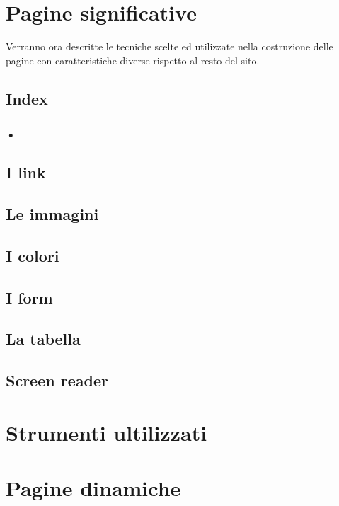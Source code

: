 \documentclass[10pt,a4paper,onecolumn]{article}
\begin{document}
\clearpage

\section{Pagine significative}

Verranno ora descritte le tecniche scelte ed utilizzate nella costruzione delle pagine con caratteristiche diverse rispetto al resto del sito.

\subsection{Index}

\subsubsection{•}


\subsection{I link}

\subsection{Le immagini}

\subsection{I colori}


\subsection{I form}


\subsection{La tabella}


\subsection{Screen reader}

\clearpage

\section{Strumenti ultilizzati}\label{sec:strumenti}

\section{Pagine dinamiche}
\end{document}

